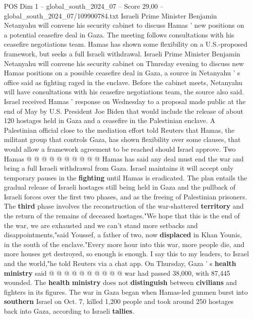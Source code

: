 \begin{textsample}{POS Dim 1 – global\_south\_2024\_07 – Score 29.00 – global\_south\_2024\_07/109900784.txt}  \label{ex:f1_pos_178}
Israeli Prime Minister Benjamin Netanyahu will convene his security cabinet to discuss Hamas ' new positions on a potential ceasefire deal in Gaza.
The meeting follows consultations with his ceasefire negotiations team.
Hamas has shown some flexibility on a U.S.-proposed framework, but seeks a full Israeli withdrawal.
Israeli Prime Minister Benjamin Netanyahu will convene his security cabinet on Thursday evening to discuss new Hamas positions on a possible ceasefire deal in Gaza, a source in Netanyahu ' s office said as fighting raged in the enclave.
Before the cabinet meets, Netanyahu will have consultations with his ceasefire negotiations team, the source also said.
Israel received Hamas ' response on Wednesday to a proposal made public at the end of May by U.S.
President Joe Biden that would include the release of about 120 hostages held in Gaza and a ceasefire in the Palestinian enclave.
A Palestinian official close to the mediation effort told Reuters that Hamas, the militant group that controls Gaza, has shown flexibility over some clauses, that would allow a framework agreement to be reached should Israel approve.
Two Hamas @ @ @ @ @ @ @ @ @ @ Hamas has said any deal must end the war and bring a full Israeli withdrawal from Gaza.
Israel maintains it will accept only temporary pauses in the \textbf{fighting} until Hamas is eradicated.
The plan entails the gradual release of Israeli hostages still being held in Gaza and the pullback of Israeli forces over the first two phases, and as the freeing of Palestinian prisoners.
The \textbf{third} phase involves the reconstruction of the war-shattered \textbf{territory} and the return of the remains of deceased hostages."We hope that this is the end of the war, we are exhausted and we can't stand more setbacks and disappointments,"said Youssef, a father of two, now \textbf{displaced} in Khan Younis, in the south of the enclave."Every more hour into this war, more people die, and more houses get destroyed, so enough is enough.
I say this to my leaders, to Israel and the world,"he told Reuters via a chat app.
On Thursday, Gaza ' s \textbf{health} \textbf{ministry} said @ @ @ @ @ @ @ @ @ @ war had passed 38,000, with 87,445 wounded.
The \textbf{health} \textbf{ministry} does not \textbf{distinguish} between \textbf{civilians} and fighters in its figures.
The war in Gaza began when Hamas-led gunmen burst into \textbf{southern} Israel on Oct. 7, killed 1,200 people and took around 250 hostages back into Gaza, according to Israeli \textbf{tallies}.

\end{textsample}
